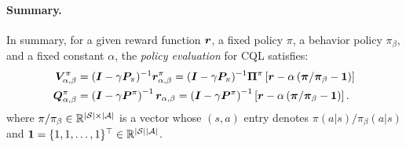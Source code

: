 \paragraph{Summary.} In summary, for a given reward function $\boldsymbol r$, a fixed policy $\pi$, a behavior policy $\pi_\beta$, and a fixed constant $\alpha$, the {\em policy evaluation} for CQL satisfies:
\begin{equation}
    \label{eq:cql-consistency-equation}
    \begin{split}
         \boldsymbol V_{\alpha,\beta}^{\pi} & = (\boldsymbol I - \gamma \boldsymbol P_\pi)^{-1}\boldsymbol r_{\alpha,\beta}^\pi = (\boldsymbol I - \gamma \boldsymbol P_\pi)^{-1}\boldsymbol \Pi^\pi\left[ \boldsymbol r - \alpha\left( \boldsymbol\pi/\boldsymbol\pi_\beta-\boldsymbol 1 \right) \right] \\
         \boldsymbol Q^\pi_{\alpha,\beta}&=\left( \boldsymbol I - \gamma \boldsymbol P^\pi \right)^{-1}\boldsymbol r_{\alpha,\beta}=\left( \boldsymbol I - \gamma \boldsymbol P^\pi \right)^{-1}\left[ \boldsymbol r - \alpha\left( \boldsymbol\pi/\boldsymbol\pi_\beta-\boldsymbol 1 \right) \right].
    \end{split}
\end{equation}
where $\pi/\pi_\beta\in \mathbb R^{|\mathcal S|\times |\mathcal A|}$ is a vector whose $(s,a)$ entry denotes $\pi(a|s)/\pi_\beta(a|s)$ and $\boldsymbol 1=\{1,1,\dots,1\}^\top\in \mathbb R^{|\mathcal S||\mathcal A|}$.


